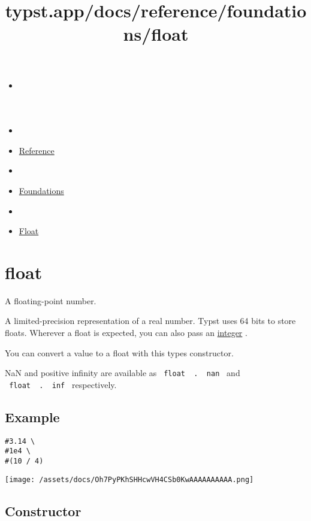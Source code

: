 \title{typst.app/docs/reference/foundations/float}

\begin{itemize}
\tightlist
\item
  \href{/docs}{}
\item
  
\item
  \href{/docs/reference/}{Reference}
\item
  
\item
  \href{/docs/reference/foundations/}{Foundations}
\item
  
\item
  \href{/docs/reference/foundations/float/}{Float}
\end{itemize}

\section{\texorpdfstring{{ float }}{ float }}\label{summary}

A floating-point number.

A limited-precision representation of a real number. Typst uses 64 bits
to store floats. Wherever a float is expected, you can also pass an
\href{/docs/reference/foundations/int/}{integer} .

You can convert a value to a float with this type\textquotesingle s
constructor.

NaN and positive infinity are available as
\texttt{\ float\ }{\texttt{\ .\ }}\texttt{\ nan\ } and
\texttt{\ float\ }{\texttt{\ .\ }}\texttt{\ inf\ } respectively.

\subsection{Example}\label{example}

\begin{verbatim}
#3.14 \
#1e4 \
#(10 / 4)
\end{verbatim}

\texttt{[image: /assets/docs/Oh7PyPKhSHHcwVH4CSb0KwAAAAAAAAAA.png]}

\subsection{\texorpdfstring{Constructor
{}}{Constructor }}\label{constructor}


